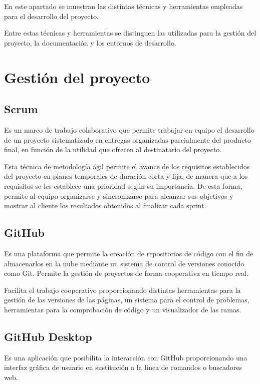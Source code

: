 
En este apartado se muestran las distintas técnicas y herramientas empleadas para el desarrollo del proyecto.

Entre estas técnicas y herramientas se distinguen las utilizadas para la gestión del proyecto, la documentación y los entornos de desarrollo.

\section{Gestión del proyecto}
\subsection{Scrum}
\cite{Scrum1_bib} Es un marco de trabajo colaborativo que permite trabajar en equipo el desarrollo de un proyecto sistematizado en entregas organizadas parcialmente del producto final, en función de la utilidad que ofrecen al destinatario del proyecto. 

\cite{Scrum2_bib} Esta técnica de metodología ágil permite el avance de los requisitos establecidos del proyecto en planes temporales de duración corta y fija, de manera que a los requisitos se les establece una prioridad según su importancia. De esta forma, permite al equipo organizarse y sincronizarse para alcanzar sus objetivos y mostrar al cliente los resultados obtenidos al finalizar cada sprint.

\subsection{GitHub}
\cite{GitHub1_bib} Es una plataforma que permite la creación de repositorios de código con el fin de almacenarlos en la nube mediante un sistema de control de versiones conocido como Git. Permite la gestión de proyectos de forma cooperativa en tiempo real.

\cite{GitHub2_bib} Facilita el trabajo cooperativo proporcionando distintas herramientas para la gestión de las versiones de las páginas, un sistema para el control de problemas, herramientas para la comprobación de código y un visualizador de las ramas.

\subsection{GitHub Desktop}
\cite{GitHubDesktop_bib} Es una aplicación que posibilita la interacción con GitHub proporcionando una interfaz gráfica de usuario en sustitución a la línea de comandos o buscadores web.

